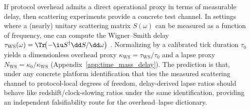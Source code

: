 If protocol overhead admits a direct operational proxy in terms of measurable delay, then scattering experiments provide a concrete test channel.
In settings where a (nearly) unitary scattering matrix $S(\omega)$ can be measured as a function of frequency, one can compute the Wigner--Smith delay $\tau_{\mathrm{WS}}(\omega)=\Tr\!\bigl(-\iu S^\dagger \dd S/\dd\omega\bigr)$ \cite{Wigner1955,Smith1960}.
Normalizing by a calibrated tick duration $\tau_0$ yields a dimensionless overhead proxy $\kappa_{\mathrm{WS}}=\tau_{\mathrm{WS}}/\tau_0$ and a lapse proxy $N_{\mathrm{WS}}=\kappa_0/\kappa_{\mathrm{WS}}$ (Appendix~\ref{app:time_mass_delay}).
The prediction is that, under any concrete platform identification that ties the measured scattering channel to protocol-local degrees of freedom, delay-derived lapse ratios should behave like redshift/clock-slowing ratios under the same identification, providing an independent falsifiability route for the overhead--lapse dictionary.


